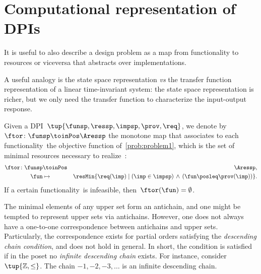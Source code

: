 

\section{Computational representation of DPIs}
\label{sec:solving-representation-of-dpis}



It is useful to also describe a design problem as a map from functionality to resources or viceversa that abstracts over implementations.

A useful analogy is the state space representation \emph{vs} the transfer function representation of a linear time-invariant system: the state space representation is richer, but we only need the transfer function to characterize the input-output response.

\begin{definition}
  \label{def:ftor}
  Given a DPI~$\tup{ \funsp,\ressp,\impsp,\prov,\req} $,
  we denote by~$\ftor\colon \funsp\toinPos\Aressp$ the monotone map that associates
  to each functionality~\fun the objective function of~\cref{prob:problem1},
  which is the set of minimal resources necessary to realize~\fun:
  \begin{eqnarray*}
    \ftor\colon \funsp & \toinPos & \Aressp,\\
    \fun& \mapsto & \resMin\{\req(\imp)\mid\left(\imp\in\impsp\right)\,\wedge\,\left(\fun\posleq\prov(\imp)\right)\}.
  \end{eqnarray*}
  If a certain functionality~\fun is infeasible, then~$\ftor(\fun)=\emptyset$.
\end{definition}


\begin{remark}
  The minimal elements of any upper set form an antichain, and one might be tempted to represent upper sets via antichains.
  However, one does not always have a one-to-one correspondence between antichains and upper sets.
  Particularly, the correspondence exists for partial orders satisfying the \emph{descending chain condition}, and does not hold in general.
  In short, the condition is satisfied if in the poset  no \emph{infinite descending chain} exists.
  For instance, consider~$\tup{\mathbb{Z},\leq}$. The chain $-1, -2, -3, \ldots$ is an infinite descending chain.
\end{remark}


